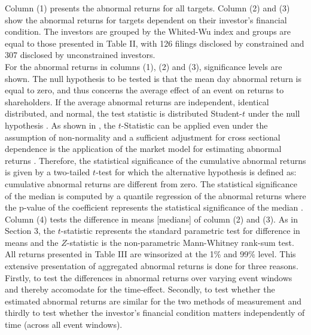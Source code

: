 \documentclass[12pt]{article}
\begin{document}


\noindent Column (1) presents the abnormal returns for all targets. Column (2) and (3) show the abnormal returns for targets dependent on their investor's financial condition. The investors are grouped by the Whited-Wu index and groups are equal to those presented in Table II, with 126 filings disclosed by constrained and 307 disclosed by unconstrained investors.\\
For the abnormal returns in columns (1), (2) and (3), significance levels are shown. The null hypothesis to be tested is that the mean day abnormal return is equal to zero, and thus concerns the average effect of an event on returns to shareholders. If the average abnormal returns are independent, identical distributed, and normal, the test statistic is distributed Student-$t$ under the null hypothesis \citep[p.7]{Brown1985}. As shown in \citet[p.11]{Brown1985}, the $t$-Statistic can be applied even under the assumption of non-normality and a sufficient adjustment for cross sectional dependence is the application of the market model for estimating abnormal returns \citep[p.22]{Brown1985}. Therefore, the statistical significance of the cumulative abnormal returns is given by a two-tailed $t$-test for which the alternative hypothesis is defined as: cumulative abnormal returns are different from zero. The statistical significance of the median is computed by a quantile regression of the abnormal returns where the p-value of the coefficient represents the statistical significance of the median \citep{Ucla}. Column (4) tests the difference in means [medians] of column (2) and (3). As in Section 3, the $t$-statistic represents the standard parametric test for difference in means and the $Z$-statistic is the non-parametric Mann-Whitney rank-sum test.
All returns  presented in Table III are winsorized at the 1\% and 99\% level. This extensive presentation of aggregated abnormal returns is done for three reasons. Firstly, to test the differences in abnormal returns over varying event windows and thereby accomodate for the time-effect. Secondly, to test whether the estimated abnormal returns are similar for the two methods of measurement and thirdly to test whether the investor's financial condition matters independently of time (across all event windows).
\end{document}

